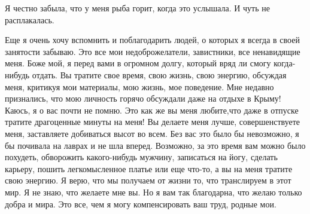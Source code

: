 Я честно забыла, что у меня рыба горит, когда это услышала. И чуть не
расплакалась. 

Еще я очень хочу вспомнить и поблагодарить людей, о которых я всегда в своей
занятости забываю. Это все мои недоброжелатели, завистники, все ненавидящие
меня. Боже мой, я перед вами в огромном долгу, который вряд ли смогу
когда-нибудь отдать. Вы тратите свое время, свою жизнь, свою энергию, обсуждая
меня, критикуя мои материалы, мою жизнь, мое поведение. Мне недавно признались,
что мою личность горячо обсуждали даже на отдыхе в Крыму! Каюсь, я о вас почти
не помню. Это как же вы меня любите,что даже в отпуске тратите драгоценные
минуты на меня! Вы делаете меня лучше, совершенствуете меня, заставляете
добиваться высот во всем. Без вас это было бы невозможно, я бы почивала на
лаврах и не шла вперед. Возможно, за это время вам можно было похудеть,
обворожить какого-нибудь мужчину, записаться на йогу, сделать карьеру, пошить
легкомысленное платье или еще что-то, а вы на меня тратите свою энергию. Я
верю, что мы получаем от жизни то, что транслируем в этот мир. Я не знаю, что
желаете мне вы. Но я вам так благодарна, что желаю только добра и мира. Это
все, чем я могу компенсировать ваш труд, родные мои.

